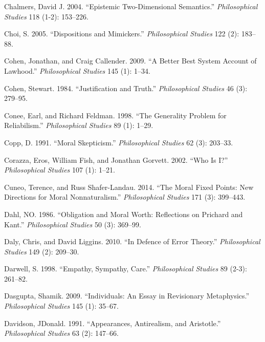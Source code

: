\documentclass[
  10pt,
  letterpaper,
  DIV=11,
  numbers=noendperiod,
  twoside]{scrartcl}
\newlength{\cslhangindent}
\newenvironment{CSLReferences}[2] %
 {\begin{list}{}{%
  \setlength{\itemindent}{0pt}
  \setlength{\leftmargin}{0pt}
  \setlength{\parsep}{0pt}
  \ifodd #1
   \setlength{\leftmargin}{\cslhangindent}
   \setlength{\itemindent}{-1\cslhangindent}
  \fi
  \setlength{\itemsep}{#2\baselineskip}}}
 {\end{list}}
\begin{document}
\begin{CSLReferences}{1}{0}
Chalmers, David J. 2004. {``Epistemic Two-Dimensional Semantics.''}
\emph{Philosophical Studies} 118 (1-2): 153--226.

Choi, S. 2005. {``Dispositions and Mimickers.''} \emph{Philosophical
Studies} 122 (2): 183--88.

Cohen, Jonathan, and Craig Callender. 2009. {``A Better Best System
Account of Lawhood.''} \emph{Philosophical Studies} 145 (1): 1--34.

Cohen, Stewart. 1984. {``Justification and Truth.''} \emph{Philosophical
Studies} 46 (3): 279--95.

Conee, Earl, and Richard Feldman. 1998. {``The Generality Problem for
Reliabilism.''} \emph{Philosophical Studies} 89 (1): 1--29.

Copp, D. 1991. {``Moral Skepticism.''} \emph{Philosophical Studies} 62
(3): 203--33.

Corazza, Eros, William Fish, and Jonathan Gorvett. 2002. {``Who Is
{I}?''} \emph{Philosophical Studies} 107 (1): 1--21.

Cuneo, Terence, and Russ Shafer-Landau. 2014. {``The Moral Fixed Points:
New Directions for Moral Nonnaturalism.''} \emph{Philosophical Studies}
171 (3): 399--443.

Dahl, NO. 1986. {``Obligation and Moral Worth: Reflections on Prichard
and Kant.''} \emph{Philosophical Studies} 50 (3): 369--99.

Daly, Chris, and David Liggins. 2010. {``In Defence of Error Theory.''}
\emph{Philosophical Studies} 149 (2): 209--30.

Darwell, S. 1998. {``Empathy, Sympathy, Care.''} \emph{Philosophical
Studies} 89 (2-3): 261--82.

Dasgupta, Shamik. 2009. {``Individuals: An Essay in Revisionary
Metaphysics.''} \emph{Philosophical Studies} 145 (1): 35--67.

Davidson, JDonald. 1991. {``Appearances, Antirealism, and Aristotle.''}
\emph{Philosophical Studies} 63 (2): 147--66.


\end{CSLReferences}
\end{document}

